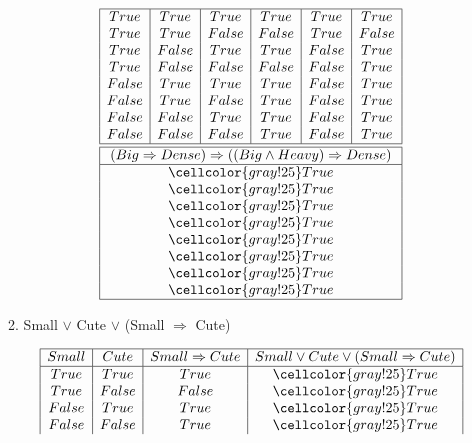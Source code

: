 \documentclass[10pt]{article}
\begin{document}
\begin{enumerate}
\begin{enumerate}
\begin{displaymath}
\begin{array} {|c|c|c|c|c|c|}
      \hline
      True & True & True & True & True & True \\
      True & True & False & False & True & False \\
      True & False & True & True & False & True  \\
      True & False & False & False & False & True \\
      False & True & True & True & False & True  \\
      False & True & False & True & False & True \\
      False & False & True & True & False & True \\
      False & False & False & True & False & True \\
      \hline\hline
      \multicolumn{6}{|c|}{(Big \Rightarrow Dense) \Rightarrow ((Big \wedge Heavy) \Rightarrow Dense)} \\
      \hline
      \multicolumn{6}{|c|}{\cellcolor{gray!25}True} \\
      \multicolumn{6}{|c|}{\cellcolor{gray!25}True} \\
      \multicolumn{6}{|c|}{\cellcolor{gray!25}True} \\
      \multicolumn{6}{|c|}{\cellcolor{gray!25}True} \\
      \multicolumn{6}{|c|}{\cellcolor{gray!25}True} \\
      \multicolumn{6}{|c|}{\cellcolor{gray!25}True} \\
      \multicolumn{6}{|c|}{\cellcolor{gray!25}True} \\
      \multicolumn{6}{|c|}{\cellcolor{gray!25}True} \\
      \hline
    \end{array}
  \end{displaymath}
  \item Small $\vee$ Cute $\vee$ (Small $\Rightarrow$ Cute) \par
  \begin{displaymath}
    \begin{array} {|c|c|c|c|}
  	  \hline
      Small & Cute & Small \Rightarrow Cute & Small \vee Cute \vee (Small \Rightarrow Cute) \\
      \hline
      True & True & True & \cellcolor{gray!25}True \\
      True & False & False & \cellcolor{gray!25}True \\
      False & True & True & \cellcolor{gray!25}True \\
      False & False & True & \cellcolor{gray!25}True \\

\end{array}
\end{displaymath}
\end{enumerate}
\end{enumerate}
\end{document}
